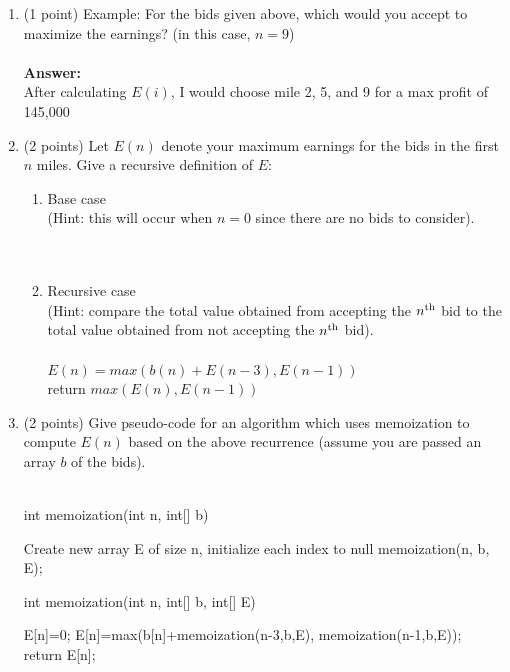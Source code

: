 \documentclass[12pt]{elsart}
\begin{document}
   \begin{enumerate}
      \item (1 point) Example:  For the bids given above, which would you accept to maximize the earnings? (in this case, $n=9$)\\\\
	{\bf Answer:}\\
	After calculating $E(i)$, I would choose mile 2, 5, and 9 for a max profit of 145,000\\
      \item (2 points) Let $E(n)$ denote your maximum earnings for the bids in the first $n$ miles.  Give a recursive definition of $E$:
   \begin{enumerate}
      \item Base case \\(Hint: this will occur when $n=0$ since there are no bids to consider).\\\\
	\\
      \item Recursive case \\(Hint: compare the total value obtained from accepting the $n\textsuperscript{th}$ bid to the total value obtained from not accepting the $n\textsuperscript{th}$ bid).\\\\
	$E(n) = max(b(n)+E(n-3), E(n-1))$\\
	return $max(E(n), E(n-1))$\\
   \end{enumerate}
\newpage
      \item (2 points) Give pseudo-code for an algorithm which uses memoization to compute $E(n)$ based on the above recurrence (assume you are passed an array $b$ of the bids).\\\\
	\begin{algorithm}
	\caption{int memoization(int n, int[] b)}
	\begin{algorithmic}
	\State Create new array E of size n, initialize each index to null
	\State memoization(n, b, E);
	\end{algorithmic}
	\end{algorithm}
	\begin{algorithm}
	\caption{int memoization(int n, int[] b, int[] E)}
	\begin{algorithmic}
	\If {E[n]==null}
		\If {n==0}
		\State E[n]=0;
		\Else
		\State E[n]=max(b[n]+memoization(n-3,b,E), memoization(n-1,b,E));
		\EndIf
	\EndIf
	\State return E[n];
	\end{algorithmic}
	\end{algorithm}
	
   \end{enumerate}
\end{document}
